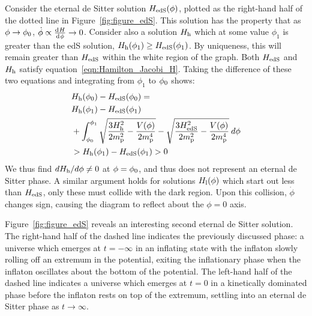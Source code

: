 Consider the eternal de Sitter solution $H_\mathrm{edS}(\phi)$, plotted as the right-hand half of the dotted line in Figure~\ref{fig:figure_edS}.  This solution has the property that as $\phi\to\phi_0$, $\dot{\phi}\propto\frac{\operatorname{d}^{}\!{H}}{\operatorname{d}^{}\!{\phi}}\to0$. Consider also a solution $H_\mathrm{h}$ which at some value $\phi_1$ is greater than the edS solution, $H_\mathrm{h}(\phi_1) \ge H_\mathrm{edS}(\phi_1)$. By uniqueness, this will remain greater than $H_\mathrm{edS}$ within the white region of the graph. Both $H_\mathrm{edS}$ and $H_\mathrm{h}$ satisfy equation~\eqref{eqn:Hamilton_Jacobi_H}.  Taking the difference of these two equations and integrating from $\phi_1$ to $\phi_0$ shows:
%
\begin{align}
  &H_\mathrm{h}(\phi_0)-H_\mathrm{edS}(\phi_0)= \nonumber\\
  &H_\mathrm{h}(\phi_1)-H_\mathrm{edS}(\phi_1) \nonumber\\
  & + \int_{\phi_0}^{\phi_1} 
  \sqrt{\frac{3H_\mathrm{h}^2}{2m_{\mathrm{p}}^2} - 
  \frac{V(\phi)}{2m_{\mathrm{p}}^4}}-\sqrt{\frac{3H_\mathrm{edS}^2}{2m_{\mathrm{p}}^2} - 
  \frac{V(\phi)}{2m_{\mathrm{p}}^4}}\:d\phi \nonumber \\
  &>H_\mathrm{h}(\phi_1)-H_\mathrm{edS}(\phi_1)>0 \nonumber
\end{align}
%
We thus find ${dH_\mathrm{h}}/{d\phi}\ne0$ at $\phi=\phi_0$, and thus does not represent an eternal de Sitter phase. A similar argument holds for solutions $H_\mathrm{l}(\phi)$ which start out less than $H_\mathrm{edS}$, only these must collide with the dark region. Upon this collision, $\dot{\phi}$ changes sign, causing the diagram to reflect about the $\phi=0$ axis.

Figure~\ref{fig:figure_edS} reveals an interesting second eternal de Sitter solution. The right-hand half of the dashed line indicates the previously discussed phase: a universe which emerges at $t=-\infty$ in an inflating state with the inflaton slowly rolling off an extremum in the potential, exiting the inflationary phase when the inflaton oscillates about the bottom of the potential.  The left-hand half of the dashed line indicates a universe which emerges at $t=0$ in a kinetically dominated phase before the inflaton rests on top of the extremum, settling into an eternal de Sitter phase as $t\to\infty$.

